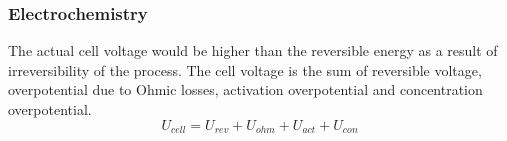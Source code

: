 \subsubsection{Electrochemistry} 
The actual cell voltage would be higher than the reversible energy  as a result of irreversibility of the process. The cell voltage is the sum of reversible voltage, overpotential due to Ohmic losses, activation overpotential and concentration overpotential.
\begin{equation} 
U_{cell}=U_{rev}+U_{ohm}+U_{act}+U_{con}
\end{equation} 


